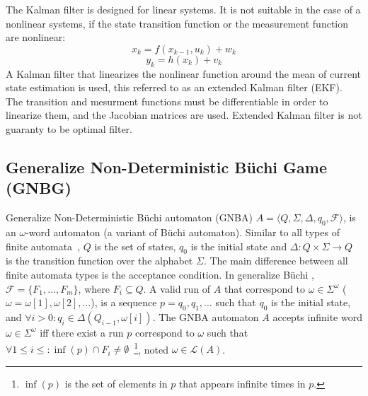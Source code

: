 \documentclass[ twoside, 12pt ]{article}
\newcommand{\buchi}{B\"uchi }
\begin{document}
The Kalman filter is designed for linear systems. It is not suitable in the case of a nonlinear systems, if the state transition function or the measurement function are nonlinear:
$$x_{k}=f(x_{k-1} , u_{k}) + w_{k}$$
$$y_k=h(x_k) + v_k$$
A Kalman filter that linearizes the nonlinear function around the mean of current state estimation is used, this referred to as an extended Kalman filter (EKF).
The transition and mesurment functions must be differentiable in order to linearize them, and the Jacobian matrices are used.
Extended Kalman filter is not guaranty to be optimal filter.



\subsection{Generalize Non-Deterministic \buchi Game (GNBG)}
\label{sec:GNBG}

Generalize Non-Deterministic \buchi automaton (GNBA) $A= \langle Q,\Sigma,\Delta,q_0,\mathcal{F} \rangle $, is an $\omega$-word automaton (a variant of \buchi automaton).
Similar to all types of finite automata~\cite{sipser2006introduction}, $Q$ is the set of states, $q_0$ is the initial state and $\Delta : Q \times \Sigma \xrightarrow{} Q$ is the transition function over the alphabet $\Sigma$.
The main difference between all finite automata types is the acceptance condition.
In generalize \buchi, $\mathcal{F} = \{ F_1 , \dots , F_m \}$, where $F_i \subseteq Q$.
A valid run of $A$ that correspond to $\omega \in \Sigma^\omega$ ($\omega = \omega[1], \omega[2], \dots$), is a sequence $p=q_0,q_1, \dots$ such that $q_0$ is the initial state, and $\forall i>0 : q_i \in \Delta(Q_{i-1}, \omega[i])$.
The GNBA automaton $A$ accepts infinite word $\omega \in \Sigma^\omega$ iff there exist a run $p$ correspond to $\omega$ such that $\forall 1 \le i \le : \inf(p) \cap F_i \neq \emptyset$~\footnote{$\inf(p)$ is the set of elements in $p$ that appears infinite times in $p$.}, noted $\omega \in \mathcal{L}(A)$.
\end{document}
